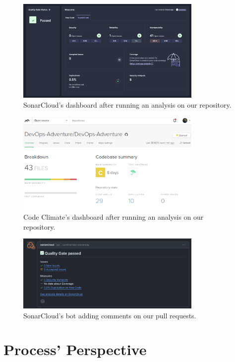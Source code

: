 \documentclass{article}
\begin{document}
\begin{figure}[ht]
    \centering
    \includegraphics[width=0.8\textwidth]{./images/SonarCloud_Analysis.png}
    \caption{SonarCloud's dashboard after running an analysis on our repository.}
    \label{fig:sc_dashboard}
\end{figure}
\begin{figure}[ht]
    \centering
    \includegraphics[width=0.8\textwidth]{./images/CodeClimate_analysis.png}
    \caption{Code Climate's dashboard after running an analysis on our repository.}
    \label{fig:cc_dashboard}
\end{figure}
\begin{figure}[ht]
    \centering
    \includegraphics[width=0.8\textwidth]{./images/SonarCloud_bot.png}
    \caption{SonarCloud's bot adding comments on our pull requests.}
    \label{fig:sc_bot_dashboard}
\end{figure}
\pagebreak
\section{Process' Perspective}
\end{document}
